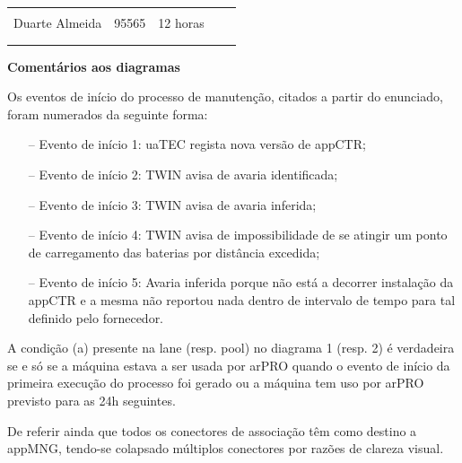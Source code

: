 \documentclass{article}
\begin{document}
\begin{table}[H]
\begin{tabular}{|l|l|l|l|l}
        \multicolumn{1}{|l|}{}                   & \multicolumn{1}{l|}{}       & \multicolumn{1}{l|}{}                             & \multicolumn{1}{l|}{}                   &  \\
        \multicolumn{1}{|c|}{Duarte Almeida}     & \multicolumn{1}{c|}{95565}  & \multicolumn{1}{c|}{12 horas}                     & \multicolumn{1}{l|}{}                   &  \\
        \multicolumn{1}{|l|}{}                   & \multicolumn{1}{l|}{}       & \multicolumn{1}{l|}{}                             & \multicolumn{1}{l|}{}                   &  \\
        \multicolumn{1}{|l|}{}                   & \multicolumn{1}{l|}{}       & \multicolumn{1}{l|}{}                             & \multicolumn{1}{l|}{}                   &  \\ \cline{1-4}
        \end{tabular}
        \end{table}

    \vspace{0.3cm}

    \noindent \large \textbf{Comentários aos diagramas}

    \vspace{0.5em} \normalsize
    Os eventos de início do processo de manutenção, citados a partir do enunciado, foram numerados da seguinte forma:
    \vspace{-0.1em}
    \begin{itemize}
        \itemsep0em 
        \item[--] Evento de início 1: uaTEC regista nova versão de appCTR;
        \item[--] Evento de início 2: TWIN avisa de avaria identificada;
        \item[--] Evento de início 3: TWIN avisa de avaria inferida;
        \item[--] Evento de início 4: TWIN avisa de impossibilidade de se atingir um ponto de carregamento das baterias por distância excedida;
        \item[--] Evento de início 5: Avaria inferida porque não está a decorrer instalação da appCTR e a mesma não reportou nada dentro de intervalo de tempo para tal definido pelo fornecedor. 
    \end{itemize} \par
    \vspace{-0.1em}
    A condição (a) presente na lane (resp. pool) no diagrama 1 (resp. 2) é verdadeira se e só se a máquina estava a ser usada por arPRO quando o evento
    de início da primeira execução do processo foi gerado ou a máquina tem uso por arPRO previsto para as 24h seguintes. \par
    De referir ainda que todos os conectores de associação têm como destino a appMNG, tendo-se colapsado múltiplos conectores por razões de clareza visual.
    \pagebreak
\end{document}
